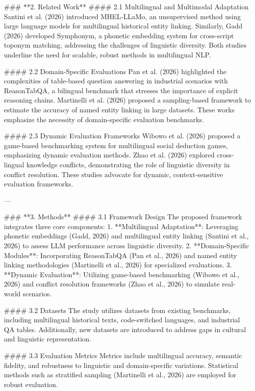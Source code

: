 ### **2. Related Work**  
#### 2.1 Multilingual and Multimodal Adaptation  
Santini et al. (2026) introduced MHEL-LLaMo, an unsupervised method using large language models for multilingual historical entity linking. Similarly, Gadd (2026) developed Symphonym, a phonetic embedding system for cross-script toponym matching, addressing the challenges of linguistic diversity. Both studies underline the need for scalable, robust methods in multilingual NLP.

#### 2.2 Domain-Specific Evaluations  
Pan et al. (2026) highlighted the complexities of table-based question answering in industrial scenarios with ReasonTabQA, a bilingual benchmark that stresses the importance of explicit reasoning chains. Martinelli et al. (2026) proposed a sampling-based framework to estimate the accuracy of named entity linking in large datasets. These works emphasize the necessity of domain-specific evaluation benchmarks.

#### 2.3 Dynamic Evaluation Frameworks  
Wibowo et al. (2026) proposed a game-based benchmarking system for multilingual social deduction games, emphasizing dynamic evaluation methods. Zhao et al. (2026) explored cross-lingual knowledge conflicts, demonstrating the role of linguistic diversity in conflict resolution. These studies advocate for dynamic, context-sensitive evaluation frameworks.

---

### **3. Methods**  
#### 3.1 Framework Design  
The proposed framework integrates three core components:  
1. **Multilingual Adaptation**: Leveraging phonetic embeddings (Gadd, 2026) and multilingual entity linking (Santini et al., 2026) to assess LLM performance across linguistic diversity.  
2. **Domain-Specific Modules**: Incorporating ReasonTabQA (Pan et al., 2026) and named entity linking methodologies (Martinelli et al., 2026) for specialized evaluations.  
3. **Dynamic Evaluation**: Utilizing game-based benchmarking (Wibowo et al., 2026) and conflict resolution frameworks (Zhao et al., 2026) to simulate real-world scenarios.

#### 3.2 Datasets  
The study utilizes datasets from existing benchmarks, including multilingual historical texts, code-switched languages, and industrial QA tables. Additionally, new datasets are introduced to address gaps in cultural and linguistic representation.

#### 3.3 Evaluation Metrics  
Metrics include multilingual accuracy, semantic fidelity, and robustness to linguistic and domain-specific variations. Statistical methods such as stratified sampling (Martinelli et al., 2026) are employed for robust evaluation.


